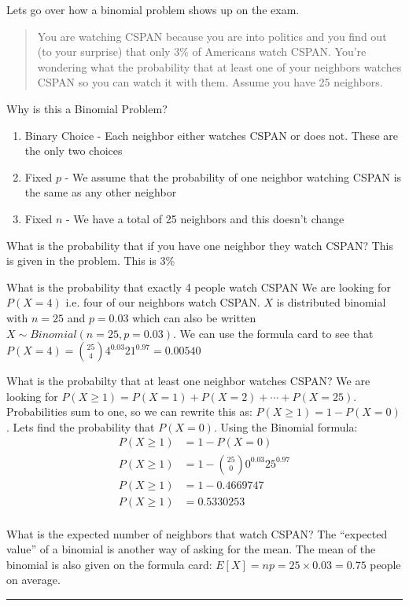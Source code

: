 \documentclass[landscape]{article}
\newcommand{\myline}{\vspace{4pt}\hrule  \vspace{4pt}}
\newenvironment{topic}[1]{
	\noindent \textbf{\textsc{\color{harvardcrimson}{#1}}}
	\noindent \hspace{-3.5pt}
}{
	\myline
}
\newenvironment{compactenum}{
	\begin{enumerate}[leftmargin=*,labelsep=5pt]
	}{
	\end{enumerate}
}
\newenvironment{compactdesc}{
	\begin{description}[leftmargin=1em,labelsep=0.7em, font=\normalfont\itshape]
	}{
	\end{description}
}
\begin{document}
\begin{multicols*}{3}
	\begin{topic}{Binomial Example}
		Lets go over how a binomial problem shows up on the exam. 
		\begin{quote}
			You are watching CSPAN because you are into politics and you find out (to your surprise) that only 3\% of Americans watch CSPAN. You're wondering what the probability that at least one of your neighbors watches CSPAN so you can watch it with them. Assume you have 25 neighbors.
		\end{quote}
		\begin{compactdesc}
			\item[Why is this a Binomial Problem?]
			\begin{compactenum}
				\item Binary Choice - Each neighbor either watches CSPAN or does not. These are the only two choices
				\item Fixed $ p $ - We assume that the probability of one neighbor watching CSPAN is the same as any other neighbor
				\item Fixed $ n $ - We have a total of 25 neighbors and this doesn't change
			\end{compactenum} 
			\item[What is the probability that if you have one neighbor they watch CSPAN?] This is given in the problem. This is 3\%
			\item[What is the probability that exactly 4 people watch CSPAN] We are looking for $ P(X = 4) $ i.e. four of our neighbors watch CSPAN. $ X $ is distributed binomial with $ n = 25 $ and $ p = 0.03 $ which can also be written $ X \sim Binomial(n = 25, p = 0.03) $. We can use the formula card to see that $ P(X = 4) = \binom{25}{4} 4^{0.03} 21^{0.97} = 0.00540$
			\item[What is the probabilty that at least one neighbor watches CSPAN?] We are looking for $ P(X \geq 1) = P(X = 1) + P(X = 2) + \cdots + P(X = 25)$. Probabilities sum to one, so we can rewrite this as: $ P(X\geq 1) = 1 - P(X = 0) $. Lets find the probability that $ P(X = 0) $. Using the Binomial formula:
			\begin{align*}
			P(X\geq 1) &= 1 - P(X = 0)\\
			P(X\geq 1) &= 1 - \binom{25}{0} 0^{0.03} 25^{0.97}\\
			P(X\geq 1) &= 1 - 0.4669747\\
			P(X\geq 1) &= 0.5330253\\
			\end{align*}  
			\item[What is the expected number of neighbors that watch CSPAN?] The ``expected value'' of a binomial is another way of asking for the mean. The mean of the binomial is also given on the formula card: $ E[X] = np = 25\times 0.03 = 0.75 $ people on average. 
		\end{compactdesc}
	\end{topic}
	

\end{multicols*}
\end{document}
